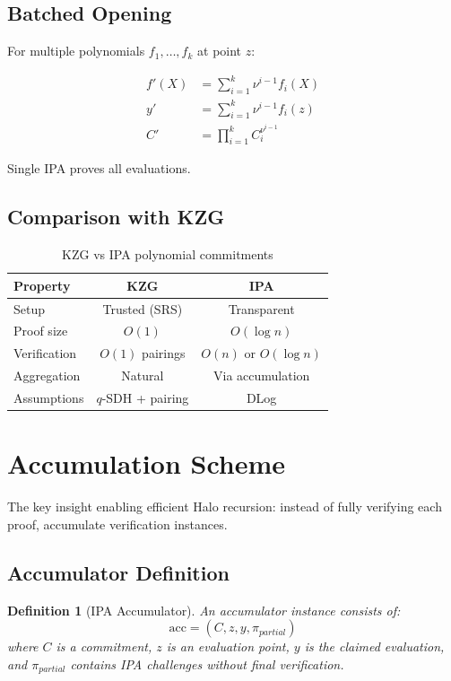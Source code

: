 \documentclass[11pt,a4paper]{article}
\newtheorem{definition}[theorem]{Definition}
\begin{document}
\subsection{Batched Opening}

For multiple polynomials $f_1, \ldots, f_k$ at point $z$:

\begin{align*}
f'(X) &= \sum_{i=1}^k \nu^{i-1} f_i(X) \\
y' &= \sum_{i=1}^k \nu^{i-1} f_i(z) \\
C' &= \prod_{i=1}^k C_i^{\nu^{i-1}}
\end{align*}

Single IPA proves all evaluations.

\subsection{Comparison with KZG}

\begin{table}[h]
\centering
\begin{tabular}{lcc}
\toprule
\textbf{Property} & \textbf{KZG} & \textbf{IPA} \\
\midrule
Setup & Trusted (SRS) & Transparent \\
Proof size & $O(1)$ & $O(\log n)$ \\
Verification & $O(1)$ pairings & $O(n)$ or $O(\log n)$ \\
Aggregation & Natural & Via accumulation \\
Assumptions & $q$-SDH + pairing & DLog \\
\bottomrule
\end{tabular}
\caption{KZG vs IPA polynomial commitments}
\label{tab:kzg-ipa}
\end{table}

\section{Accumulation Scheme}
\label{sec:accumulation}

The key insight enabling efficient Halo recursion: instead of fully verifying each proof, accumulate verification instances.

\subsection{Accumulator Definition}

\begin{definition}[IPA Accumulator]
An accumulator instance consists of:
\[
\text{acc} = (C, z, y, \pi_{partial})
\]
where $C$ is a commitment, $z$ is an evaluation point, $y$ is the claimed evaluation, and $\pi_{partial}$ contains IPA challenges without final verification.
\end{definition}
\end{document}
